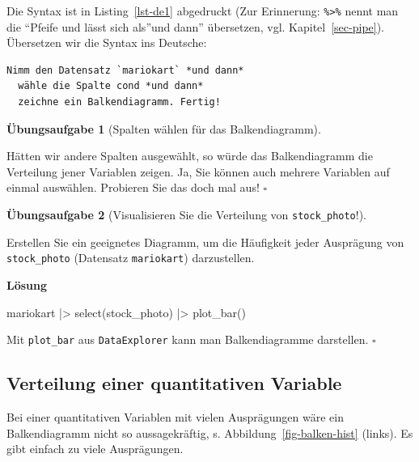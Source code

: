 \documentclass[
  letterpaper,
  twoside,
  open=any]{scrbook}
\newenvironment{Shaded}{\begin{snugshade}}{\end{snugshade}}
\newcommand{\FunctionTok}[1]{\textcolor[rgb]{0.28,0.35,0.67}{#1}}
\newcommand{\NormalTok}[1]{\textcolor[rgb]{0.00,0.23,0.31}{#1}}
\newcommand{\SpecialCharTok}[1]{\textcolor[rgb]{0.37,0.37,0.37}{#1}}
\theoremstyle{definition}
\theoremstyle{definition}
\newtheorem{exercise}{Übungsaufgabe}[chapter]
\theoremstyle{definition}
\theoremstyle{remark}
\begin{document}
Die Syntax ist in Listing~\ref{lst-de1} abgedruckt (Zur Erinnerung:
\texttt{\%\textgreater{}\%} nennt man die \enquote{Pfeife und lässt sich
als}und dann'' übersetzen, vgl. Kapitel~\ref{sec-pipe}). Übersetzen wir
die Syntax ins Deutsche:

\begin{verbatim}
Nimm den Datensatz `mariokart` *und dann*
  wähle die Spalte cond *und dann*
  zeichne ein Balkendiagramm. Fertig!
\end{verbatim}

\begin{exercise}[Spalten wählen für das
Balkendiagramm]\protect\hypertarget{exr-de1}{}\label{exr-de1}

Hätten wir andere Spalten ausgewählt, so würde das Balkendiagramm die
Verteilung jener Variablen zeigen. Ja, Sie können auch mehrere Variablen
auf einmal auswählen. Probieren Sie das doch mal aus! \(\square\)

\end{exercise}

\begin{exercise}[Visualisieren Sie die Verteilung von
\texttt{stock\_photo}!]\protect\hypertarget{exr-balken}{}\label{exr-balken}

Erstellen Sie ein geeignetes Diagramm, um die Häufigkeit jeder
Ausprägung von \texttt{stock\_photo} (Datensatz \texttt{mariokart})
darzustellen.

\textbf{Lösung}

\begin{Shaded}
\begin{Highlighting}[]
\NormalTok{mariokart }\SpecialCharTok{|\textgreater{}} 
  \FunctionTok{select}\NormalTok{(stock\_photo) }\SpecialCharTok{|\textgreater{}} 
  \FunctionTok{plot\_bar}\NormalTok{()}
\end{Highlighting}
\end{Shaded}

Mit \texttt{plot\_bar} aus \texttt{DataExplorer} kann man
Balkendiagramme darstellen. \(\square\)

\end{exercise}

\subsection{Verteilung einer quantitativen
Variable}\label{verteilung-einer-quantitativen-variable}

Bei einer quantitativen Variablen mit vielen Ausprägungen wäre ein
Balkendiagramm nicht so aussagekräftig, s.
Abbildung~\ref{fig-balken-hist} (links). Es gibt einfach zu viele
Ausprägungen.
\end{document}
